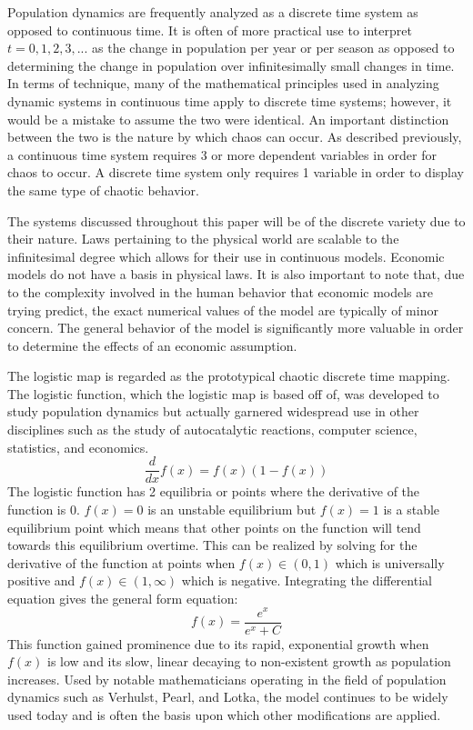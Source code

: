 Population dynamics are frequently analyzed as a discrete time system as opposed to continuous time. It is often of more practical use to interpret $t= 0,1,2,3,...$ as the change in population per year or per season as opposed to determining the change in population over infinitesimally small changes in time. In terms of technique, many of the mathematical principles used in analyzing dynamic systems in continuous time apply to discrete time systems; however, it would be a mistake to assume the two were identical. An important distinction between the two is the nature by which chaos can occur. As described previously, a continuous time system requires 3 or more dependent variables in order for chaos to occur. A discrete time system only requires 1 variable in order to display the same type of chaotic behavior.

The systems discussed throughout this paper will be of the discrete variety due to their nature. Laws pertaining to the physical world are scalable to the infinitesimal degree which allows for their use in continuous models. Economic models do not have a basis in physical laws. It is also important to note that, due to the complexity involved in the human behavior that economic models are trying predict, the exact numerical values of the model are typically of minor concern. The general behavior of the model is significantly more valuable in order to determine the effects of an economic assumption.

The logistic map is regarded as the prototypical chaotic discrete time mapping. The logistic function, which the logistic map is based off of, was developed to study population dynamics but actually garnered widespread use in other disciplines such as the study of autocatalytic reactions, computer science, statistics, and economics\autocite{Kavanagh1934}.
\begin{equation}
    \frac{d}{dx}f(x)=f(x)(1-f(x))
\end{equation}
The logistic function has 2 equilibria or points where the derivative of the function is 0. $f(x) = 0$ is an unstable equilibrium but $f(x)=1$ is a stable equilibrium point which means that other points on the function will tend towards this equilibrium overtime.  This can be realized by solving for the derivative of the function at points when $f(x)\in(0,1)$ which is universally positive and $f(x)\in(1,\infty)$ which is negative. Integrating the differential equation gives the general form equation:
\begin{equation}
    f(x)=\frac{e^x}{e^x+C}
\end{equation}
This function gained prominence due to its rapid, exponential growth when $f(x)$ is low and its slow, linear decaying to non-existent growth as population increases.  Used by notable mathematicians operating in the field of population dynamics such as Verhulst, Pearl, and Lotka, the model continues to be widely used today and is often the basis upon which other modifications are applied\autocite{Zwanzig1973}.

